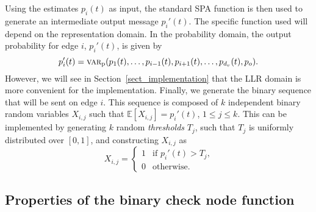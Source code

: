 \documentclass[12pt,journal,twoside,draftcls,onecolumn]{IEEEtran}
\newcommand{\E}{\mathbb{E}}
\begin{document}
	Using the estimates $p_i(t)$ as input, the standard SPA function is then used to generate an intermediate output message $p_{i}'(t)$. The specific function used will depend on the representation domain. In the probability domain, the output probability for edge $i$, $p_{i}'(t)$, is given by
	\begin{equation}
	\label{eqn_SPAprob}
	p_{i}'(t) = \textsc{var}_\mathrm{p}(p_1(t), \ldots , p_{i-1}(t), p_{i+1}(t), \ldots , p_{d_v}(t), p_o).
	\end{equation}
	However, we will see in Section~\ref{sect_implementation} that the LLR domain is more convenient for the implementation.
	Finally, we generate the binary sequence that will be sent on edge $i$. This sequence is composed of $k$ independent binary random variables $X_{i,j}$ such that $\E[X_{i,j}] = p_{i}'(t)$, $1 \leq j \leq k$. This can be implemented by generating $k$ random \emph{thresholds} $T_j$, such that $T_j$ is uniformly distributed over $[0, 1]$, and constructing $X_{i,j}$ as
	\begin{equation}
	\label{eqn_binmsg}
	X_{i,j} =
	\begin{cases}
	1 & \text{if $p_{i}'(t) > T_j$,} \\
	0 & \text{otherwise.}
	\end{cases}
	\end{equation}
	


\subsection{Properties of the binary check node function}
\label{sect_chkproperties}
\end{document}
